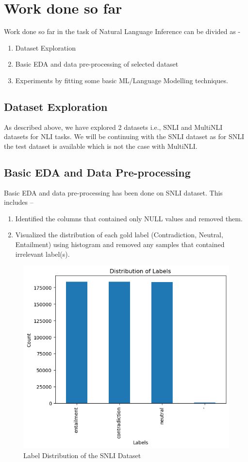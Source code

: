 
\section{Work done so far}

Work done so far in the task of Natural Language Inference can be divided as -

\begin{enumerate}
	\item Dataset Exploration
	\item Basic EDA and data pre-processing of selected dataset
	\item Experiments by fitting some basic ML/Language Modelling techniques.
\end{enumerate}


\subsection{Dataset Exploration}
As described above, we have explored 2 datasets i.e., SNLI and MultiNLI datasets for NLI tasks. We will be continuing with the SNLI dataset as for SNLI the test dataset is  available which is not the case with MultiNLI.

\subsection{Basic EDA and Data Pre-processing}
Basic EDA and data pre-processing has been done on SNLI dataset. This includes – 
\begin{enumerate}
	\item Identified the columns that contained only NULL values and removed them.
	\item Visualized the distribution of each gold label (Contradiction, Neutral, Entailment) using histogram and removed any samples that contained irrelevant label(s).
\end{enumerate}

\begin{figure}[h]
	\centering
	\includegraphics[scale=0.7]{img/label_distribution.png}
	\caption{Label Distribution of the SNLI Dataset}
\end{figure}

